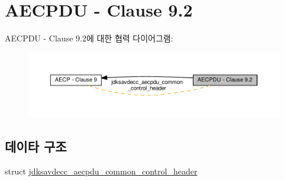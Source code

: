 \hypertarget{group__aecpdu}{}\section{A\+E\+C\+P\+DU -\/ Clause 9.2}
\label{group__aecpdu}
A\+E\+C\+P\+DU -\/ Clause 9.2에 대한 협력 다이어그램\+:
\nopagebreak
\begin{figure}[H]
\begin{center}
\leavevmode
\includegraphics[width=350pt]{group__aecpdu}
\end{center}
\end{figure}
\subsection*{데이타 구조}
\begin{DoxyCompactItemize}
\item 
struct \hyperlink{structjdksavdecc__aecpdu__common__control__header}{jdksavdecc\+\_\+aecpdu\+\_\+common\+\_\+control\+\_\+header}
\end{DoxyCompactItemize}
